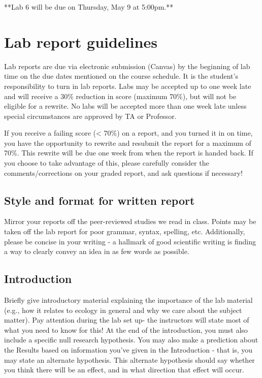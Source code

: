 \documentclass[11pt,]{article}
\begin{document}
\begin{flushright}

**Lab 6 will be due on Thursday, May 9 at 5:00pm.**

\end{flushright}

\newpage

\hypertarget{lab-report-guidelines}{%
\section{Lab report guidelines}\label{lab-report-guidelines}}

Lab reports are due via electronic submission (Canvas) by the beginning
of lab time on the due dates mentioned on the course schedule. It is the
student's responsibility to turn in lab reports. Labs may be accepted up
to one week late and will receive a 30\% reduction in score (maximum
70\%), but will not be eligible for a rewrite. No labs will be accepted
more than one week late unless special circumstances are approved by TA
or Professor.

If you receive a failing score (\textless{} 70\%) on a report, and you
turned it in on time, you have the opportunity to rewrite and resubmit
the report for a maximum of 70\%. This rewrite will be due one week from
when the report is handed back. If you choose to take advantage of this,
please carefully consider the comments/corrections on your graded
report, and ask questions if necessary!

\hypertarget{style-and-format-for-written-report}{%
\subsection{Style and format for written
report}\label{style-and-format-for-written-report}}

Mirror your reports off the peer-reviewed studies we read in class.
Points may be taken off the lab report for poor grammar, syntax,
spelling, etc. Additionally, please be concise in your writing - a
hallmark of good scientific writing is finding a way to clearly convey
an idea in as few words as possible.

\hypertarget{introduction}{%
\subsection{Introduction}\label{introduction}}

Briefly give introductory material explaining the importance of the lab
material (e.g., how it relates to ecology in general and why we care
about the subject matter). Pay attention during the lab set up- the
instructors will state most of what you need to know for this! At the
end of the introduction, you must also include a specific null research
hypothesis. You may also make a prediction about the Results based on
information you've given in the Introduction - that is, you may state an
alternate hypothesis. This alternate hypothesis should say whether you
think there will be an effect, and in what direction that effect will
occur.
\end{document}
